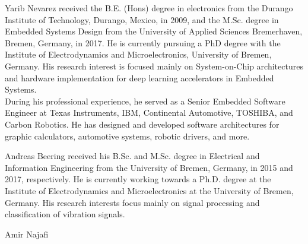 \begin{IEEEbiography}{Yarib Nevarez} received the B.E. (Hons) degree in electronics from the Durango Institute of Technology, Durango, Mexico, in 2009, and the M.Sc. degree in Embedded Systems Design from the University of Applied Sciences Bremerhaven, Bremen, Germany, in 2017. He is currently pursuing a PhD degree with the Institute of Electrodynamics and Microelectronics, University of Bremen, Germany. His research interest is focused mainly on System-on-Chip architectures and hardware implementation for deep learning accelerators in Embedded Systems.
\\
During his professional experience, he served as a Senior Embedded Software Engineer at Texas Instruments, IBM, Continental Automotive, TOSHIBA, and Carbon Robotics. He has designed and developed software architectures for graphic calculators, automotive systems, robotic drivers, and more.
	
\end{IEEEbiography}

\begin{IEEEbiography}{Andreas Beering} received his B.Sc. and M.Sc. degree in Electrical and Information Engineering  from the University of Bremen, Germany, in 2015 and 2017, respectively. He is currently working towards a Ph.D. degree at the Institute of Electrodynamics and Microelectronics at the University of Bremen, Germany. His research interests focus mainly on signal processing and classification of vibration signals.
\end{IEEEbiography}

\begin{IEEEbiography}{Amir Najafi}
\end{IEEEbiography}

